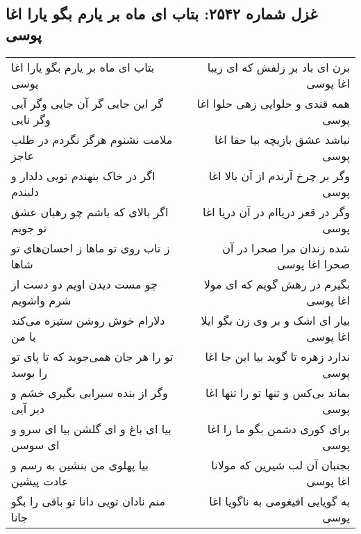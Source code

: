\begin{center}
\section*{غزل شماره ۲۵۴۲: بتاب ای ماه بر یارم بگو یارا اغا پوسی}
\label{sec:2542}
\begin{longtable}{l p{0.5cm} r}
بتاب ای ماه بر یارم بگو یارا اغا پوسی
&&
بزن ای باد بر زلفش که ای زیبا اغا پوسی
\\
گر این جایی گر آن جایی وگر آیی وگر نایی
&&
همه قندی و حلوایی زهی حلوا اغا پوسی
\\
ملامت نشنوم هرگز نگردم در طلب عاجز
&&
نباشد عشق بازیچه بیا حقا اغا پوسی
\\
اگر در خاک بنهندم تویی دلدار و دلبندم
&&
وگر بر چرخ آرندم از آن بالا اغا پوسی
\\
اگر بالای که باشم چو رهبان عشق تو جویم
&&
وگر در قعر دریاام در آن دریا اغا پوسی
\\
ز تاب روی تو ماها ز احسان‌های تو شاها
&&
شده زندان مرا صحرا در آن صحرا اغا پوسی
\\
چو مست دیدن اویم دو دست از شرم واشویم
&&
بگیرم در رهش گویم که ای مولا اغا پوسی
\\
دلارام خوش روشن ستیزه می‌کند با من
&&
بیار ای اشک و بر وی زن بگو ایلا اغا پوسی
\\
تو را هر جان همی‌جوید که تا پای تو را بوسد
&&
ندارد زهره تا گوید بیا این جا اغا پوسی
\\
وگر از بنده سیرابی بگیری خشم و دیر آیی
&&
بماند بی‌کس و تنها تو را تنها اغا پوسی
\\
بیا ای باغ و ای گلشن بیا ای سرو و ای سوسن
&&
برای کوری دشمن بگو ما را اغا پوسی
\\
بیا پهلوی من بنشین به رسم و عادت پیشین
&&
بجنبان آن لب شیرین که مولانا اغا پوسی
\\
منم نادان تویی دانا تو باقی را بگو جانا
&&
به گویایی افیغومی به ناگویا اغا پوسی
\\
\end{longtable}
\end{center}
